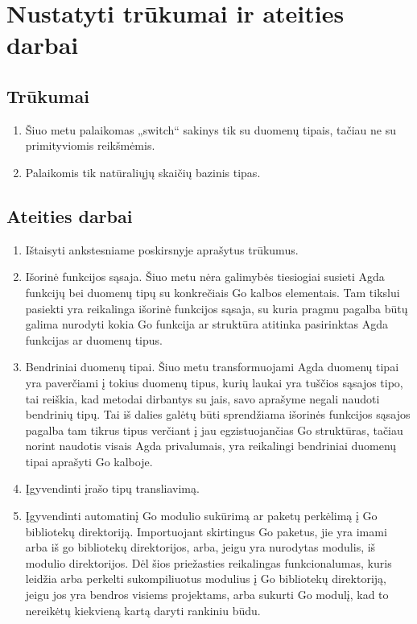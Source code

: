 \documentclass{VUMIFPSbakalaurinis}
\begin{document}
\section{Nustatyti trūkumai ir ateities darbai} \label{darbai}
\subsection{Trūkumai}
\begin{enumerate}
	\item Šiuo metu palaikomas „switch“ sakinys tik su duomenų tipais, tačiau ne su primityviomis reikšmėmis.
	\item Palaikomis tik natūraliųjų skaičių bazinis tipas.
\end{enumerate}
\subsection{Ateities darbai}
\begin{enumerate}[noitemsep]
	\item Ištaisyti ankstesniame poskirsnyje aprašytus trūkumus.
  \item Išorinė funkcijos sąsaja. Šiuo metu nėra galimybės tiesiogiai susieti Agda funkcijų bei duomenų tipų su konkrečiais Go kalbos elementais. Tam tikslui pasiekti yra reikalinga išorinė funkcijos sąsaja, su kuria pragmu pagalba būtų galima nurodyti kokia Go funkcija ar struktūra atitinka pasirinktas Agda funkcijas ar duomenų tipus.
  \item Bendriniai duomenų tipai. Šiuo metu transformuojami Agda duomenų tipai yra paverčiami į tokius duomenų tipus, kurių laukai yra tuščios sąsajos tipo, tai reiškia, kad metodai dirbantys su jais, savo aprašyme negali naudoti bendrinių tipų. Tai iš dalies galėtų būti sprendžiama išorinės funkcijos sąsajos pagalba tam tikrus tipus verčiant į jau egzistuojančias Go struktūras, tačiau norint naudotis visais Agda privalumais, yra reikalingi bendriniai duomenų tipai aprašyti Go kalboje.
  \item Įgyvendinti įrašo tipų transliavimą. 
  \item Įgyvendinti automatinį Go modulio sukūrimą ar paketų perkėlimą į Go bibliotekų direktoriją. Importuojant skirtingus Go paketus, jie yra imami arba iš go bibliotekų direktorijos, arba, jeigu yra nurodytas modulis, iš modulio direktorijos. Dėl šios priežasties reikalingas funkcionalumas, kuris leidžia arba perkelti sukompiliuotus modulius į Go bibliotekų direktoriją, jeigu jos yra bendros visiems projektams, arba sukurti Go modulį, kad to nereikėtų kiekvieną kartą daryti rankiniu būdu.
\end{enumerate}
\end{document}
